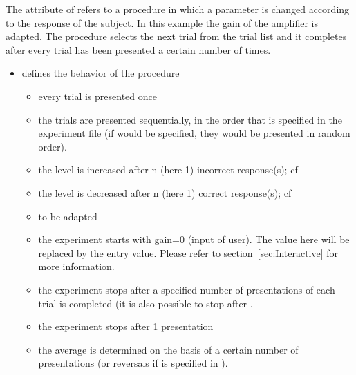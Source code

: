 The attribute  of
 refers to a procedure in which a parameter is
changed according to the response of the subject. In this example
the gain of the amplifier is adapted. The procedure selects the
next trial from the trial list and it completes after every trial
has been presented a certain number of times.

\begin{itemize}
\item {} defines the behavior of the procedure

\begin{itemize}

\item {} every trial is presented once

\item {} the trials are presented sequentially, in
the order that is specified in the experiment file (if
 would be specified, they would be presented in random
order).

\item {} the level is increased after n (here 1)
incorrect response(s); cf 

\item {} the level is decreased after n (here 1)
correct response(s); cf 

\item {} to be adapted

\item {} the experiment starts with gain=0
(input of user). The value here will be replaced by the entry
value. Please refer to section~\ref{sec:Interactive} for more
information.

\item {} the experiment stops after a
specified number of presentations of each trial is completed (it
is also possible to stop after .

\item {} the experiment stops after 1
presentation

\item {} the average is determined on the
basis of a certain number of presentations (or reversals if
 is specified in ). 


\end{itemize}
\end{itemize}

